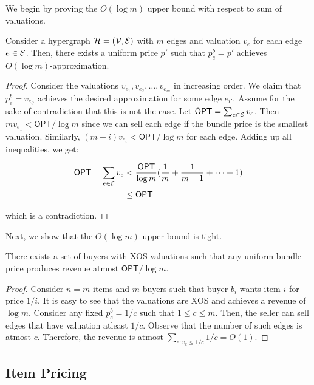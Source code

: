 We begin by proving the $O(\log m)$ upper bound with respect to sum of valuations. 

\begin{lemma}
	Consider a hypergraph $\mathcal{H} = (\mathcal{V}, \mathcal{E})$ with $m$ edges and valuation $v_e$ for each edge $e \in \mathcal{E}$. Then, there exists a uniform price $p'$ such that $p^{b}_e = p'$ achieves $O(\log m)$-approximation. 
\end{lemma}
\begin{proof}
	Consider the valuations $v_{e_1}, v_{e_2}, \dots, v_{e_m}$ in increasing order. We claim that $ p^{b}_e  = v_{e_{i'}}$ achieves the desired approximation for some edge $e_{i'}$. Assume for the sake of contradiction that this is not the case. Let $\textsf{OPT} = \sum_{e \in \mathcal{E}} v_e$. Then $m v_{e_1} < \textsf{OPT}/ \log m$ since we can sell each edge if the bundle price is the smallest valuation. Similarly, $(m - i) v_{e_i} < \textsf{OPT}/ \log m$ for each edge. Adding up all inequalities, we get:
	
	\begin{equation}
	\begin{aligned}
	\textsf{OPT} = \sum_{e \in \mathcal{E}} v_e & < \frac{\textsf{OPT}}{\log m} (\frac{1}{m} + \frac{1}{m-1} + \dots + 1) \\
	& \leq \textsf{OPT}
	\end{aligned}
	\end{equation}
	
	which is a contradiction.
\end{proof}

Next, we show that the $O(\log m)$ upper bound is tight.

\begin{lemma}
	There exists a set of buyers with XOS valuations such that any uniform bundle price produces revenue atmost $\textsf{OPT}/ \log m$.
\end{lemma}	
\begin{proof}
	Consider $n=m$ items and $m$ buyers such that buyer $b_i$ wants item $i$ for price $1/i$. It is easy to see that the valuations are XOS and achieves a revenue of $\log m$. Consider any fixed $p^b_e = 1/c$ such that $1 \leq c \leq m$. Then, the seller can sell edges that have valuation atleast $1/c$. Observe that the number of such edges is atmost $c$. Therefore, the revenue is atmost $\sum_{e:v_e \leq 1/c} 1/c = O(1)$.
\end{proof}

\subsection{Item Pricing}

